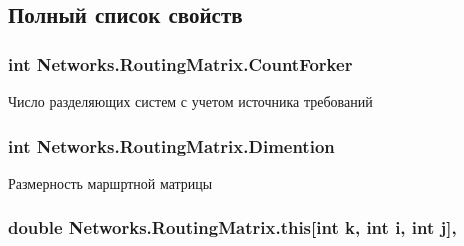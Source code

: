 \subsection{Полный список свойств}
\subsubsection[{\texorpdfstring{Count\+Forker}{CountForker}}]{\setlength{\rightskip}{0pt plus 5cm}int Networks.\+Routing\+Matrix.\+Count\+Forker\hspace{0.3cm}{\ttfamily [get]}}\hypertarget{class_networks_1_1_routing_matrix_ae2bc6f248f493e8b7e2c7a9973c48cb0}{}\label{class_networks_1_1_routing_matrix_ae2bc6f248f493e8b7e2c7a9973c48cb0}


Число разделяющих систем с учетом источника требований 

\subsubsection[{\texorpdfstring{Dimention}{Dimention}}]{\setlength{\rightskip}{0pt plus 5cm}int Networks.\+Routing\+Matrix.\+Dimention\hspace{0.3cm}{\ttfamily [get]}}\hypertarget{class_networks_1_1_routing_matrix_a01211b1807b7b63b0796c58e11b42aeb}{}\label{class_networks_1_1_routing_matrix_a01211b1807b7b63b0796c58e11b42aeb}


Размерность маршртной матрицы 

\subsubsection[{\texorpdfstring{this[int k, int i, int j]}{this[int k, int i, int j]}}]{\setlength{\rightskip}{0pt plus 5cm}double Networks.\+Routing\+Matrix.\+this\mbox{[}int k, int i, int j\mbox{]}\hspace{0.3cm}{\ttfamily [get]}, {\ttfamily [set]}}\hypertarget{class_networks_1_1_routing_matrix_a96fe5877fb4ec7f740fa1a16b65ccb89}{}\label{class_networks_1_1_routing_matrix_a96fe5877fb4ec7f740fa1a16b65ccb89}


